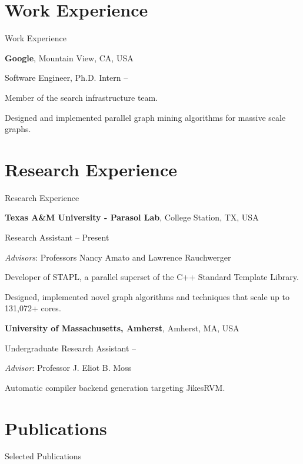 \documentclass[a4paper,10pt,oneside]{article}
\begin{document}
\begin{body}
\section{Work Experience}
{Work Experience}

\textbf{Google},
Mountain View, CA, USA
\par
Software Engineer, Ph.D. Intern
\hfill
{} --
\begin{detail}
Member of the search infrastructure team.
\par
 Designed and implemented parallel graph mining algorithms for massive scale graphs.
 \par
\end{detail}



\section{Research Experience}
{Research Experience}

\textbf{Texas A\&M University - Parasol Lab}, College Station, TX, USA
\par
Research Assistant
\hfill
{} --
Present
\begin{detail}
\par
\emph{Advisors}: Professors Nancy Amato and Lawrence Rauchwerger
\par
Developer of STAPL, a parallel superset of the C++ Standard Template Library.
\par
Designed, implemented novel graph algorithms and techniques that scale up to 131,072+ cores.
\end{detail}
\EntryGap

\textbf{University of Massachusetts, Amherst}, Amherst, MA, USA
\par
Undergraduate Research Assistant
\hfill
{} --
\begin{detail}
\emph{Advisor}: Professor J. Eliot B. Moss
\par
Automatic compiler backend generation targeting JikesRVM.
\par
\end{detail}



\section{Publications}
{Selected Publications}


\end{body}
\end{document}
